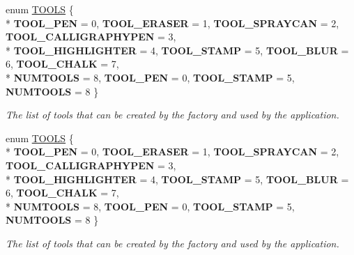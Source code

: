 \begin{DoxyCompactItemize}
\item 
enum \hyperlink{classimage__tools_1_1ToolFactory_a75e9b7d0223f34953e6ea2c45612396f}{T\+O\+O\+LS} \{ \\*
{\bfseries T\+O\+O\+L\+\_\+\+P\+EN} = 0, 
{\bfseries T\+O\+O\+L\+\_\+\+E\+R\+A\+S\+ER} = 1, 
{\bfseries T\+O\+O\+L\+\_\+\+S\+P\+R\+A\+Y\+C\+AN} = 2, 
{\bfseries T\+O\+O\+L\+\_\+\+C\+A\+L\+L\+I\+G\+R\+A\+P\+H\+Y\+P\+EN} = 3, 
\\*
{\bfseries T\+O\+O\+L\+\_\+\+H\+I\+G\+H\+L\+I\+G\+H\+T\+ER} = 4, 
{\bfseries T\+O\+O\+L\+\_\+\+S\+T\+A\+MP} = 5, 
{\bfseries T\+O\+O\+L\+\_\+\+B\+L\+UR} = 6, 
{\bfseries T\+O\+O\+L\+\_\+\+C\+H\+A\+LK} = 7, 
\\*
{\bfseries N\+U\+M\+T\+O\+O\+LS} = 8, 
{\bfseries T\+O\+O\+L\+\_\+\+P\+EN} = 0, 
{\bfseries T\+O\+O\+L\+\_\+\+S\+T\+A\+MP} = 5, 
{\bfseries N\+U\+M\+T\+O\+O\+LS} = 8
 \}\hypertarget{classimage__tools_1_1ToolFactory_a75e9b7d0223f34953e6ea2c45612396f}{}\label{classimage__tools_1_1ToolFactory_a75e9b7d0223f34953e6ea2c45612396f}
\begin{DoxyCompactList}\small\item\em The list of tools that can be created by the factory and used by the application. \end{DoxyCompactList}
\item 
enum \hyperlink{classimage__tools_1_1ToolFactory_a75e9b7d0223f34953e6ea2c45612396f}{T\+O\+O\+LS} \{ \\*
{\bfseries T\+O\+O\+L\+\_\+\+P\+EN} = 0, 
{\bfseries T\+O\+O\+L\+\_\+\+E\+R\+A\+S\+ER} = 1, 
{\bfseries T\+O\+O\+L\+\_\+\+S\+P\+R\+A\+Y\+C\+AN} = 2, 
{\bfseries T\+O\+O\+L\+\_\+\+C\+A\+L\+L\+I\+G\+R\+A\+P\+H\+Y\+P\+EN} = 3, 
\\*
{\bfseries T\+O\+O\+L\+\_\+\+H\+I\+G\+H\+L\+I\+G\+H\+T\+ER} = 4, 
{\bfseries T\+O\+O\+L\+\_\+\+S\+T\+A\+MP} = 5, 
{\bfseries T\+O\+O\+L\+\_\+\+B\+L\+UR} = 6, 
{\bfseries T\+O\+O\+L\+\_\+\+C\+H\+A\+LK} = 7, 
\\*
{\bfseries N\+U\+M\+T\+O\+O\+LS} = 8, 
{\bfseries T\+O\+O\+L\+\_\+\+P\+EN} = 0, 
{\bfseries T\+O\+O\+L\+\_\+\+S\+T\+A\+MP} = 5, 
{\bfseries N\+U\+M\+T\+O\+O\+LS} = 8
 \}\hypertarget{classimage__tools_1_1ToolFactory_a75e9b7d0223f34953e6ea2c45612396f}{}\label{classimage__tools_1_1ToolFactory_a75e9b7d0223f34953e6ea2c45612396f}
\begin{DoxyCompactList}\small\item\em The list of tools that can be created by the factory and used by the application. \end{DoxyCompactList}
\end{DoxyCompactItemize}
